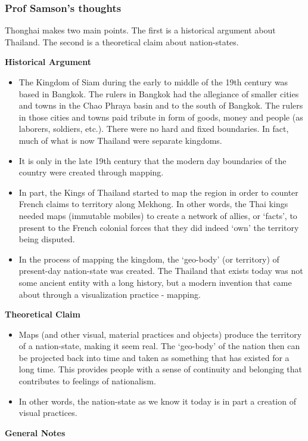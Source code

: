 \documentclass[a4paper]{article}
\begin{document}
\newpage
\subsubsection{Prof Samson's thoughts}
Thonghai makes two main points. The first is a historical argument about Thailand. The second is a theoretical claim about nation-states.

\medskip
\noindent\textbf{Historical Argument}
\begin{itemize}
	\item The Kingdom of Siam during the early to middle of the 19th century was based in Bangkok. The rulers in Bangkok had the allegiance of smaller cities and towns in the Chao Phraya basin and to the south of Bangkok. The rulers in those cities and towns paid tribute in form of goods, money and people (as laborers, soldiers, etc.). There were no hard and fixed boundaries. In fact, much of what is now Thailand were separate kingdoms. 
	\item It is only in the late 19th century that the modern day boundaries of the country were created through mapping. 
	\item In part, the Kings of Thailand started to map the region in order to counter French claims to territory along Mekhong. In other words, the Thai kings needed maps (immutable mobiles) to create a network of allies, or `facts', to present to the French colonial forces that they did indeed `own' the territory being disputed.
	\item In the process of mapping the kingdom, the `geo-body' (or territory) of present-day nation-state was created. The Thailand that exists today was not some ancient entity with a long history, but a modern invention that came about through a visualization practice - mapping. 
\end{itemize}
\noindent\textbf{Theoretical Claim}
\begin{itemize}
	\item Maps (and other visual, material practices and objects) produce the territory of a nation-state, making it seem real. The `geo-body' of the nation then can be projected back into time and taken as something that has existed for a long time. This provides people with a sense of continuity and belonging that contributes to feelings of nationalism. 
	\item In other words, the nation-state as we know it today is in part a creation of visual practices.
\end{itemize}
\noindent\textbf{General Notes}
\end{document}
